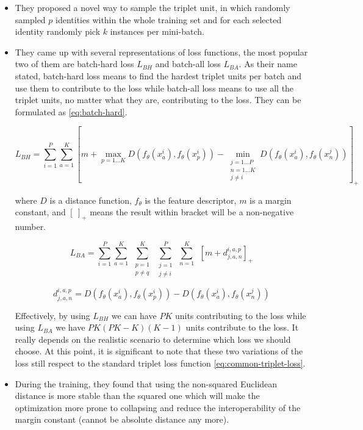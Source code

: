 \begin{itemize}
	\item They proposed a novel way to sample the triplet unit, in which randomly 
sampled $p$ identities within the whole training set and for
each selected identity randomly pick $k$ instances per mini-batch.\\
    \item They came up with several representations of loss functions, the most 
popular two of them are batch-hard loss $L_{BH}$ and batch-all loss $L_{BA}$.
As their name stated, batch-hard loss means to find the hardest triplet units
per batch and use them to contribute to the loss while batch-all loss 
means to use all the triplet units, no matter what they are, contributing 
to the loss. They can be formulated as \autoref{eq:batch-hard}.

\begin{equation}
\label{eq:batch-hard}
     L_{BH} = \sum_{i=1}^{P} \sum_{a=1}^{K}
            [
                m + \max_{p=1...K} D(f_{\theta}(x_{a}^i), f_{\theta}(x_{p}^i))
                - \min_{\substack{j=1...P\\ n=1...K\\ j\neq i}}
                D(f_{\theta}(x_{a}^i), f_{\theta}(x_{n}^j))
            ]_+
\end{equation}

\noindent where $D$ is a distance function, $f_\theta$ is the feature 
descriptor, $m$ is a margin constant, and $[\:]_+$ means the result within 
bracket will be a non-negative number.

\begin{equation}
\label{eq:batch-all}
    L_{BA} = \sum_{i=1}^{P} \sum_{a=1}^{K}  \:
             \sum_{\substack{p=1\\ p\neq q}}^{K} \:
             \sum_{\substack{j=1\\ j \neq i}}^{P} \:
             \sum_{n=1}^{K} \:\:
             [m + d_{j, a, n}^{i, a, p}]_+
\end{equation}

$$d_{j, a, n}^{i, a, p} =  D(f_{\theta}(x_{a}^i), f_{\theta}(x_{p}^i)) - D(f_{\theta}(x_{a}^i), f_{\theta}(x_{n}^j))$$

Effectively, by using $L_{BH}$ we can have $PK$ units contributing to the loss 
while using $L_{BA}$ we have $PK(PK - K)(K - 1)$ units
contribute to the loss. It really depends on the realistic scenario to 
determine which loss we should choose. At this point, it is
significant to note that these two variations of the loss still respect to the 
standard triplet loss function \autoref{eq:common-triplet-loss}.

\noindent 
\item During the training, they found that using the non-squared Euclidean 
distance is more stable than the squared one which will make the
optimization more prone to collapsing and reduce the interoperability of the 
margin constant (cannot be absolute distance any more).
\end{itemize}

